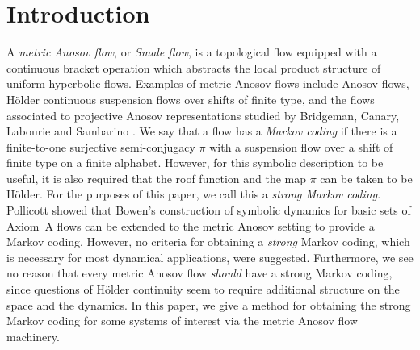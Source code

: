 \section{Introduction}

A \emph{metric Anosov flow}, or \emph{Smale flow}, is a topological flow equipped with a continuous bracket operation which abstracts the local product structure of uniform hyperbolic flows. Examples of metric Anosov flows include Anosov flows, Hölder continuous suspension flows over shifts of finite type, and the flows associated to projective Anosov representations studied by Bridgeman, Canary, Labourie and Sambarino \cite{bcls, BC17}. We say that a flow has a \emph{Markov coding} if there is a finite-to-one surjective semi-conjugacy $\pi$ with a suspension flow over a shift of finite type on a finite alphabet. However, for this symbolic description to be useful, it is also required that the roof function and the map $\pi$ can be taken to be Hölder. For the purposes of this paper, we call this a \emph{strong Markov coding}. Pollicott showed that Bowen's construction of symbolic dynamics for basic sets of Axiom~A flows can be extended to the metric Anosov setting \cite{pollicott} to provide a Markov coding. However, no criteria for obtaining a \emph{strong} Markov coding, which is necessary for most dynamical applications, were suggested. Furthermore, we see no reason that every metric Anosov flow \emph{should} have a strong Markov coding, since questions of Hölder continuity seem to require additional structure on the space and the dynamics. In this paper, we give a method for obtaining the strong Markov coding for some systems of interest via the metric Anosov flow machinery.

